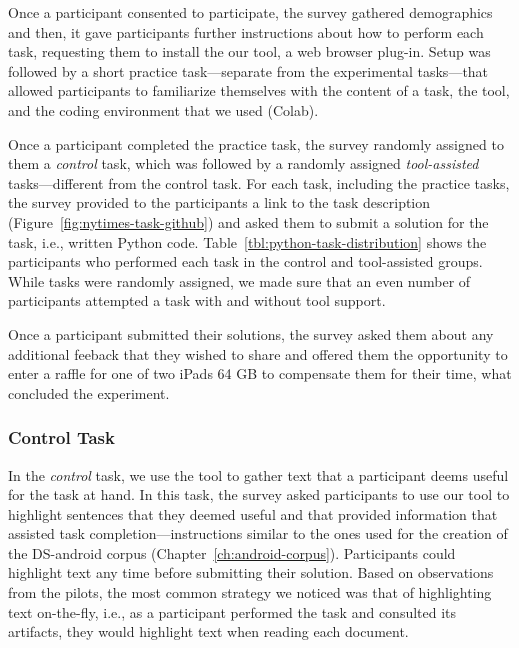 Once a participant consented to participate, the survey gathered demographics and then, 
it gave participants further instructions 
about how to perform each task, requesting them to install the our tool, a web browser plug-in.
Setup was followed by a short practice task---separate from the experimental tasks---that allowed participants to familiarize themselves with the content of a task, the tool, and the coding environment that we used (Colab). 


Once a participant completed the practice task, the survey randomly assigned to them a \textit{control} task, which was followed by a randomly assigned \textit{tool-assisted} tasks---different from the control task.
For each task, including the practice tasks, the survey provided to the participants a link 
to the task description (Figure~\ref{fig:nytimes-task-github}) and asked them to submit a solution for the task, i.e., written Python code. Table~\ref{tbl:python-task-distribution} shows the participants who performed each task in the control and tool-assisted groups. While tasks were randomly assigned, we made sure that an even number of participants attempted a task with and without tool support.


Once a participant submitted their solutions, the survey
asked them about any additional feeback that they wished to share and 
offered them the opportunity to enter a raffle for one of two iPads 64 GB 
to compensate them for their time, what concluded the experiment.





\clearpage


\subsubsection{Control Task}
\label{cp6:procedures-manual}


In the \textit{control} task, we use the tool to gather text that a participant deems useful for the task at hand. In this task, 
the survey asked participants to use our tool to highlight sentences that they deemed useful and that provided information that assisted task completion---instructions similar to the ones used for the creation of the \acs{DS-android} corpus (Chapter~\ref{ch:android-corpus}). Participants could highlight text any time before submitting their solution. 
Based on observations from the pilots, the most common strategy we noticed was that of highlighting 
text on-the-fly, i.e., as a participant performed the task and consulted its artifacts, they would highlight text 
when reading each document.



